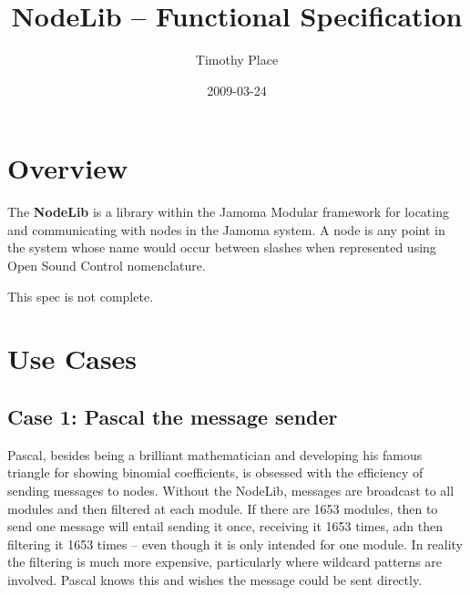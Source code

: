\documentclass[]{article}
\title{NodeLib -- Functional Specification}
\author{ Timothy Place }
\date{2009-03-24}
\begin{document}
\ifpdf
{}
\else
{}
\fi

\maketitle


\begin{abstract}
\end{abstract}





\section{Overview}

The \textbf{NodeLib} is a library within the Jamoma Modular framework for locating and communicating with nodes in the Jamoma system.  A node is any point in the system whose name would occur between slashes when represented using Open Sound Control nomenclature.  

This spec is not complete.



\section{Use Cases}

\subsection{Case 1: Pascal the message sender}

Pascal, besides being a brilliant mathematician and developing his famous triangle for showing binomial coefficients, is obsessed with the efficiency of sending messages to nodes.  Without the NodeLib, messages are broadcast to all modules and then filtered at each module.  If there are 1653 modules, then to send one message will entail sending it once, receiving it 1653 times, adn then filtering it 1653 times -- even though it is only intended for one module.  In reality the filtering is much more expensive, particularly where wildcard patterns are involved.  Pascal knows this and wishes the message could be sent directly.
\end{document}

